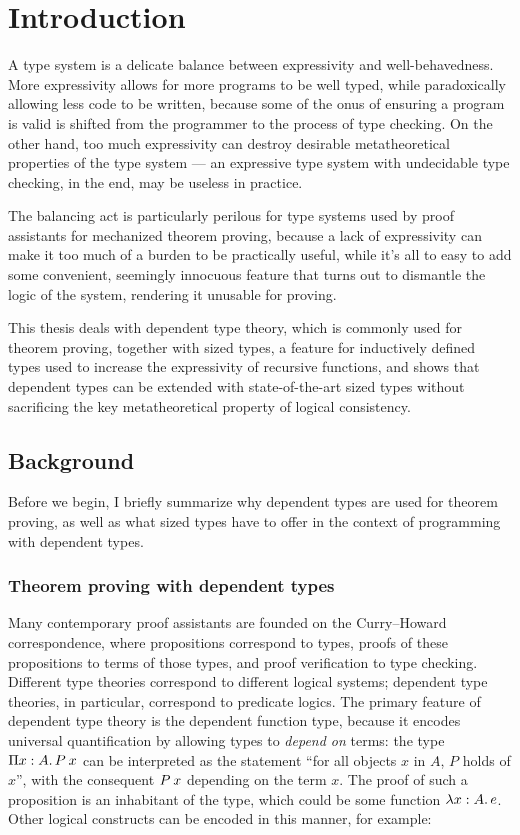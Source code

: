 \chapter{Introduction} \label{ch:introduction}

A type system is a delicate balance between expressivity and well-behavedness.
More expressivity allows for more programs to be well typed,
while paradoxically allowing less code to be written,
because some of the onus of ensuring a program is valid is shifted
from the programmer to the process of type checking.
On the other hand, too much expressivity can destroy
desirable metatheoretical properties of the type system ---
an expressive type system with undecidable type checking,
in the end, may be useless in practice.

The balancing act is particularly perilous for type systems
used by proof assistants for mechanized theorem proving,
because a lack of expressivity can make it too much of a burden to be practically useful,
while it's all to easy to add some convenient, seemingly innocuous feature
that turns out to dismantle the logic of the system,
rendering it unusable for proving.

This thesis deals with dependent type theory, which is commonly used for theorem proving,
together with sized types, a feature for inductively defined types
used to increase the expressivity of recursive functions,
and shows that dependent types can be extended with state-of-the-art sized types
without sacrificing the key metatheoretical property of logical consistency.

\section{Background}

Before we begin, I briefly summarize why dependent types are used for theorem proving,
as well as what sized types have to offer in the context of programming with dependent types.

\subsection{Theorem proving with dependent types} \label{tt}

Many contemporary proof assistants are founded on the Curry--Howard correspondence,
where propositions correspond to types,
proofs of these propositions to terms of those types,
and proof verification to type checking.
Different type theories correspond to different logical systems;
dependent type theories, in particular, correspond to predicate logics.
The primary feature of dependent type theory is the dependent function type,
because it encodes universal quantification by allowing types to \emph{depend on} terms:
the type $\funtype{x}{A}{\app{P}{x}}$ can be interpreted as the statement
``for all objects $x$ in $A$, $P$ holds of $x$'',
with the consequent $\app{P}{x}$ depending on the term $x$.
The proof of such a proposition is an inhabitant of the type,
which could be some function $\lambda x \mathrel{:} A \mathpunct{.} e$.
Other logical constructs can be encoded in this manner, for example:

